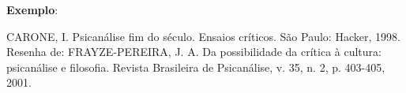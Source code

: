\begin{exemplomanual}
\textbf{Exemplo}:\\
\begin{singlespace}
CARONE, I. Psicanálise fim do século. Ensaios críticos. São Paulo: Hacker, 1998. Resenha de: FRAYZE-PEREIRA, J. A. Da possibilidade da crítica à cultura: psicanálise e filosofia. Revista Brasileira de Psicanálise, v. 35, n. 2, p. 403-405, 2001.
\end{singlespace}
\end{exemplomanual}

\nocite{ALVES2013}
\nocite{FIO:2015}
\nocite{FERREIRA1995}
\nocite{HUHNE2000}
\nocite{MAIA2009}
\nocite{SANTOS2001}
\nocite{USP:2008}
\nocite{UTFPR:2009}
